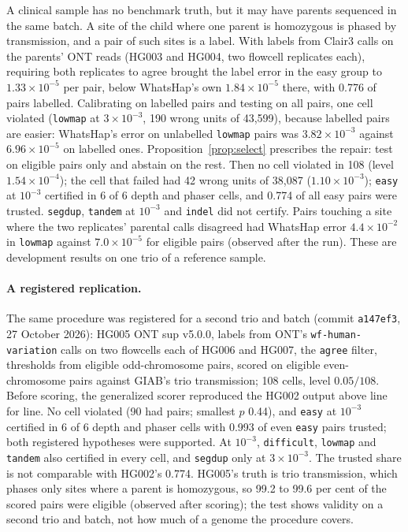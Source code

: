 \documentclass[11pt]{article}
\theoremstyle{definition}
\theoremstyle{remark}
\begin{document}
A clinical sample has no benchmark truth, but it may have parents sequenced
in the same batch. A site of the child where one parent is homozygous is
phased by transmission, and a pair of such sites is a label. With labels
from Clair3 calls on the parents' ONT reads (HG003 and HG004, two flowcell
replicates each), requiring both replicates to agree brought the label error
in the easy group to $1.33\times10^{-5}$ per pair, below WhatsHap's own
$1.84\times10^{-5}$ there, with 0.776 of pairs labelled. Calibrating on
labelled pairs and testing on all pairs, one cell violated
(\texttt{lowmap} at $3\times10^{-3}$, 190 wrong units of 43{,}599), because
labelled pairs are easier: WhatsHap's error on unlabelled \texttt{lowmap}
pairs was $3.82\times10^{-3}$ against $6.96\times10^{-5}$ on labelled ones.
Proposition~\ref{prop:select} prescribes the repair: test on eligible pairs
only and abstain on the rest. Then no cell violated in 108 (level
$1.54\times10^{-4}$); the cell that failed had 42 wrong units of 38{,}087
($1.10\times10^{-3}$); \texttt{easy} at $10^{-3}$ certified in 6 of 6 depth and
phaser cells, and 0.774 of all easy pairs were trusted. \texttt{segdup},
\texttt{tandem} at $10^{-3}$ and \texttt{indel} did not certify. Pairs
touching a site where the two replicates' parental calls disagreed had
WhatsHap error $4.4\times10^{-2}$ in \texttt{lowmap} against $7.0\times10^{-5}$
for eligible pairs (observed after the run). These are development results
on one trio of a reference sample.

\paragraph{A registered replication.} The same procedure was registered for
a second trio and batch (commit \texttt{a147ef3}, 27 October 2026): HG005 ONT
sup v5.0.0, labels from ONT's \texttt{wf-human-variation} calls on two
flowcells each of HG006 and HG007, the \texttt{agree} filter, thresholds from
eligible odd-chromosome pairs, scored on eligible even-chromosome pairs
against GIAB's trio transmission; 108 cells, level $0.05/108$. Before
scoring, the generalized scorer reproduced the HG002 output above line for
line. No cell violated (90 had pairs; smallest $p$ 0.44), and \texttt{easy}
at $10^{-3}$ certified in 6 of 6 depth and phaser cells with 0.993 of even
\texttt{easy} pairs trusted; both registered hypotheses were supported. At
$10^{-3}$, \texttt{difficult}, \texttt{lowmap} and \texttt{tandem} also
certified in every cell, and \texttt{segdup} only at $3\times10^{-3}$. The
trusted share is not comparable with HG002's 0.774. HG005's truth is trio
transmission, which phases only sites where a parent is homozygous, so 99.2
to 99.6 per cent of the scored pairs were eligible (observed after scoring);
the test shows validity on a second trio and batch, not how much of a
genome the procedure covers.
\end{document}
